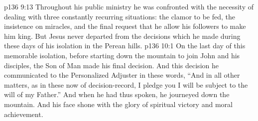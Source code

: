 \vs p136 9:13 Throughout his public ministry he was confronted with the necessity of dealing with three constantly recurring situations: the clamor to be fed, the insistence on miracles, and the final request that he allow his followers to make him king. But Jesus never departed from the decisions which he made during these days of his isolation in the Perean hills.
\vs p136 10:1 On the last day of this memorable isolation, before starting down the mountain to join John and his disciples, the Son of Man made his final decision. And this decision he communicated to the Personalized Adjuster in these words, \textcolor{ubdarkred}{“And in all other matters, as in these now of decision\hyp{}record, I pledge you I will be subject to the will of my Father.”} And when he had thus spoken, he journeyed down the mountain. And his face shone with the glory of spiritual victory and moral achievement.
